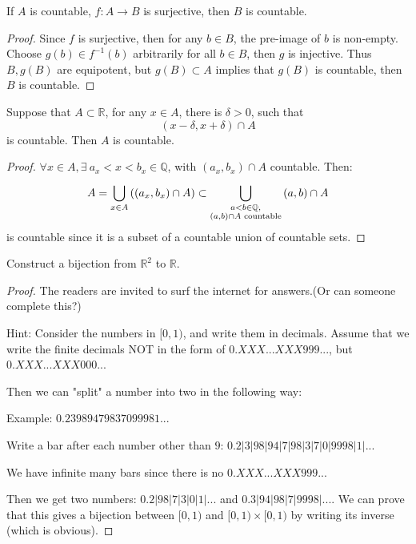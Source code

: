 \begin{problem}
If $ A $ is countable, $ f\colon A\to B $ is surjective, then $ B $ is countable.
\end{problem}

\begin{proof}
	Since $ f $ is surjective, then for any $ b\in B $,
	the pre-image of $ b $ is non-empty.
	Choose $ g(b)\in f^{-1}(b) $ arbitrarily for all $b\in B$, then $ g $ is injective.
	Thus $ B,g(B) $ are equipotent,
	but $ g(B)\subset A $ implies that $ g(B) $ is countable, then $ B $ is countable.
\end{proof}

\begin{problem}
Suppose that $ A\subset \mathbb{R} $, for any $ x\in A $, there is $ \delta>0 $, such that
$$
	(x-\delta,x+\delta)\cap A
$$
is countable. Then $ A $ is countable.
\end{problem}

\begin{proof}
	$\forall x\in A,\exists\ a_x<x<b_x\in \mathbb{Q}$, with
	$( a_x,b_x ) \cap A$ countable. Then:
	$$
		A=\bigcup_{x\in A}^{}{\left( \left( a_x,b_x \right) \cap A \right)}\subset
		\bigcup_{
			\begin{subarray}{c}
				a<b\in \mathbb{Q}, \\ ( a,b ) \cap A \text{ countable}
			\end{subarray}
		}^{}{\left( a,b \right) \cap A}
	$$
	is countable since it is a subset of a countable union of countable sets.
\end{proof}

\begin{problem}
Construct a bijection from $ \mathbb{R}^{2} $ to $ \mathbb{R} $.
\end{problem}

\begin{proof}
	The readers are invited to surf the internet for answers.(Or can someone complete this?)

    Hint: Consider the numbers in $[0,1)$, and write them in decimals. Assume that we write the finite decimals NOT in the form of $0.XXX...XXX999...$, but $0.XXX...XXX000...$

    Then we can "split" a number into two in the following way:

    Example: $0.23989479837099981...$

    Write a bar after each number other than $9$: $0.2|3|98|94|7|98|3|7|0|9998|1|...$

    We have infinite many bars since there is no $0.XXX...XXX999...$

    Then we get two numbers: $0.2|98|7|3|0|1|...$ and $0.3|94|98|7|9998|...$. We can prove that this gives a bijection between $[0,1)$ and $[0,1)\times[0,1)$ by writing its inverse (which is obvious).
\end{proof}

